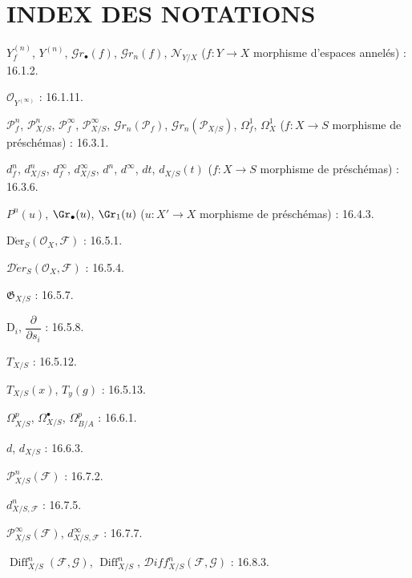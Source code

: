 \clearpage
{}
{}
\section*{INDEX DES NOTATIONS}

\begingroup
\small
\setlength{\parindent}{0pt}
\setlength{\parskip}{1.5pt}

$Y_f^{(n)}$, $Y^{(n)}$, $\mathcal{G}r_{\bullet}(f)$,
$\mathcal{G}r_n(f)$, $\mathcal{N}_{Y/X}$
($f:Y\to X$ morphisme d'espaces annelés) : 16.1.2.

$\mathcal{O}_{Y^{(\infty)}}$ : 16.1.11.

$\mathcal{P}^{n}_{f}$, $\mathcal{P}^{n}_{X/S}$,
$\mathcal{P}^{\infty}_{f}$, $\mathcal{P}^{\infty}_{X/S}$, $\mathcal{G}r_n(\mathcal{P}_f)$, $\mathcal{G}r_n(\mathcal{P}_{X/S})$,
$\varOmega^{1}_{f}$, $\varOmega^{1}_{X}$
($f:X\to S$ morphisme de préschémas) : 16.3.1.

$d^{n}_{f}$, $d^{n}_{X/S}$, $d^{\infty}_{f}$,
$d^{\infty}_{X/S}$, $d^{n}$, $d^{\infty}$, $dt$, $d_{X/S}(t)$
($f:X\to S$ morphisme de préschémas) : 16.3.6.

$P^{n}(u)$, $\Gr_{\bullet}(u)$, $\Gr_{1}(u)$
($u:X'\to X$ morphisme de préschémas) : 16.4.3.

$\operatorname{D\acute{e}r}_{S}(\mathcal{O}_{X},\mathcal{F})$ : 16.5.1.

$\mathcal{D}\acute{e}r_{S}(\mathcal{O}_{X},\mathcal{F})$ : 16.5.4.

$\mathfrak{G}_{X/S}$ : 16.5.7.

$\mathrm{D}_i$, $\dfrac{\partial}{\partial s_i}$ : 16.5.8.

$T_{X/S}$ : 16.5.12.

$T_{X/S}(x)$, $T_y(g)$ : 16.5.13.

$\varOmega^p_{X/S}$, $\varOmega^\bullet_{X/S}$, $\Omega^p_{B/A}$ : 16.6.1.

$d$, $d_{X/S}$ : 16.6.3.

$\mathcal{P}^n_{X/S}(\mathcal{F})$ : 16.7.2.

$d^n_{X/S,\mathcal{F}}$ : 16.7.5.

$\mathcal{P}^{\infty}_{X/S}(\mathcal{F})$,
$d^{\infty}_{X/S,\mathcal{F}}$ : 16.7.7.

$\operatorname{Diff}^{n}_{X/S}(\mathcal{F},\mathcal{G})$,
$\operatorname{Diff}^{n}_{X/S}$,
$\mathcal{D}iff^{n}_{X/S}(\mathcal{F},\mathcal{G})$ : 16.8.3.

